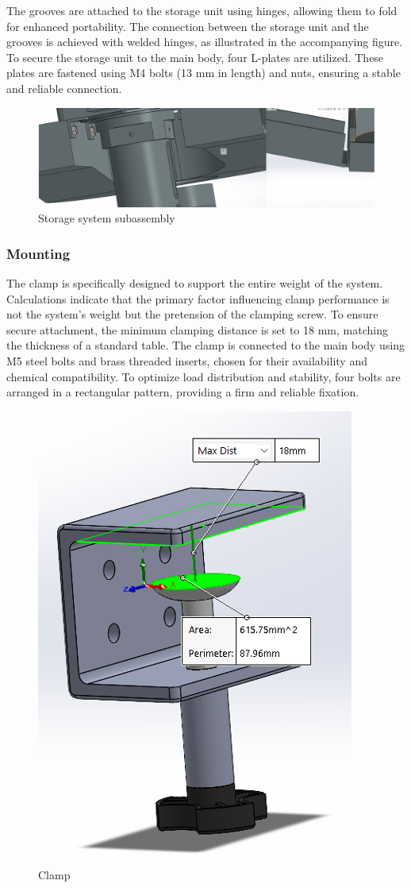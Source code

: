 \documentclass[12pt]{article}
\begin{document}
The grooves are attached to the storage unit using hinges, allowing them to fold for enhanced portability. The connection between the storage unit and the grooves is achieved with welded hinges, as illustrated in the accompanying figure. To secure the storage unit to the main body, four L-plates are utilized. These plates are fastened using M4 bolts (13 mm in length) and nuts, ensuring a stable and reliable connection.

\begin{figure}[h!]
    \centering
    \includegraphics[width=0.5\linewidth]{2.3.6.1.png}
    \caption{Storage system subassembly}
    \label{fig:enter-label}
\end{figure}

\subsubsection{Mounting}

The clamp is specifically designed to support the entire weight of the system. Calculations indicate that the primary factor influencing clamp performance is not the system's weight but the pretension of the clamping screw. To ensure secure attachment, the minimum clamping distance is set to 18 mm, matching the thickness of a standard table.
The clamp is connected to the main body using M5 steel bolts and brass threaded inserts, chosen for their availability and chemical compatibility. To optimize load distribution and stability, four bolts are arranged in a rectangular pattern, providing a firm and reliable fixation.

\begin{figure}[h!]
    \centering
    \includegraphics[width=0.3\linewidth]{2.3.7.1.png}
    \caption{Clamp}
    \label{fig:enter-label}
\end{figure}
\end{document}
